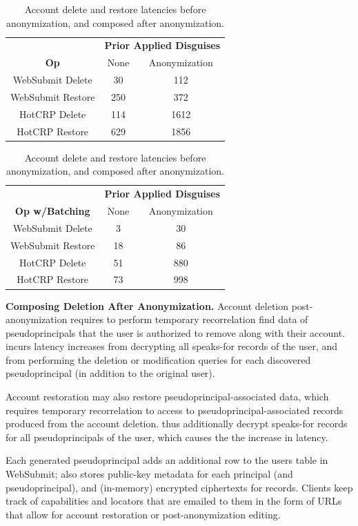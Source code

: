 \begin{table}[t!]
\begin{center}
\begin{tabular}{ c | c c }
& \multicolumn{2}{c}{\textbf{Prior Applied Disguises}} \\
    \textbf{Op} & None & Anonymization \\
\hline
WebSubmit Delete & 30 & 112 \\
WebSubmit Restore & 250 & 372\\
HotCRP Delete & 114 & 1612 \\
HotCRP Restore & 629 & 1856 \\
\end{tabular}
\quad
\begin{tabular}{ c | c c }
 & \multicolumn{2}{c}{\textbf{Prior Applied Disguises}} \\
    \textbf{Op w/Batching} & None & Anonymization \\
\hline
WebSubmit Delete  & 3 & 30 \\
WebSubmit Restore  & 18 & 86\\
HotCRP Delete  & 51 & 880 \\
HotCRP Restore  & 73 & 998
\end{tabular}
\end{center}
\caption{Account delete and restore latencies before anonymization, and composed after anonymization.}
\label{tab:composition}
\end{table}

\textbf{Composing Deletion After Anonymization.}
Account deletion post-anonymization requires \sys to perform temporary recorrelation find data of
pseudoprincipals that the user is authorized to remove along with their account. \sys incurs latency
increases from decrypting all speaks-for records of the user, and from performing the deletion or
modification queries for each discovered pseudoprincipal (in addition to the original user).

Account restoration may also restore pseudoprincipal-associated data, which requires temporary
recorrelation to access to pseudoprincipal-associated records produced from the account deletion.
\sys thus additionally decrypt speaks-for records for all pseudoprincipals of the user, which causes
the the increase in latency.


Each generated pseudoprincipal adds an additional row to the users table in WebSubmit; \sys also
stores public-key metadata for each principal (and pseudoprincipal), and (in-memory) encrypted
ciphertexts for records.  Clients keep track of capabilities and locators that are emailed to them in
the form of URLs that allow for account restoration or post-anonymization editing.

